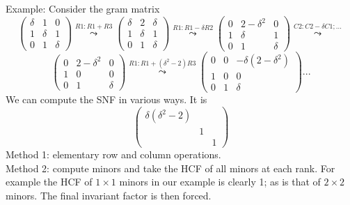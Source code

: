 \documentclass{article}
\theoremstyle{definition}
\newcommand{\mat}[1]{\left(\begin{array}{#1}}
\newcommand{\tam}{\end{array}\right)}
\numberwithin{equation}{subsection}
\begin{document}
Example:
Consider the gram matrix
\[
\mat{cccc} \delta & 1 & 0 \\ 1 & \delta & 1 \\ 0 & 1 & \delta
\tam
\stackrel{R1:R1+R3}{\leadsto}
\mat{cccc} \delta & 2 & \delta \\ 1 & \delta & 1 \\ 0 & 1 & \delta
\tam
\stackrel{R1:R1-\delta R2}{\leadsto}
\mat{cccc} 0 & 2-\delta^2 & 0 \\ 1 & \delta & 1 \\ 0 & 1 & \delta
\tam
\stackrel{C2:C2-\delta C1;...}{\leadsto}
\]\[
\mat{cccc} 0 & 2-\delta^2 & 0 \\ 1 & 0 & 0 \\ 0 & 1 & \delta
\tam
\stackrel{R1:R1+(\delta^2 -2) R3}{\leadsto}
\mat{cccc} 0 & 0 & -\delta(2-\delta^2 )  \\ 1 & 0 & 0 \\ 0 & 1 & \delta
\tam
...
\]
We can compute the SNF in various ways. It is
\[
\mat{cccc} \delta (\delta^2 -2) && \\ &1& \\ &&1 \tam
\]
Method 1: elementary row and column operations.
\\
Method 2: compute minors and take the HCF of all minors at each rank. 
For example the HCF of $1\times 1$ minors in our example is clearly 1;
as is that of $2\times 2$ minors. The final invariant factor is then
forced. 










\end{document}
